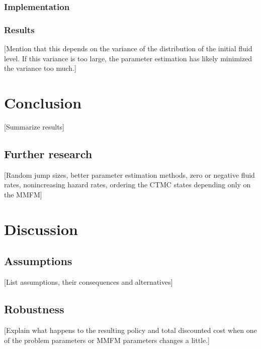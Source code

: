 \subsection{Implementation}
\subsection{Results}
[Mention that this depends on the variance of the distribution of the initial fluid level. If this variance is too large, the parameter estimation has likely minimized the variance too much.]

\chapter{Conclusion}
[Summarize results]
\section{Further research}
[Random jump sizes, better parameter estimation methods, zero or negative fluid rates, nonincreasing hazard rates, ordering the CTMC states depending only on the MMFM]

\chapter{Discussion}
\section{Assumptions}
[List assumptions, their consequences and alternatives]
\section{Robustness}
[Explain what happens to the resulting policy and total discounted cost when one of the problem parameters or MMFM parameters changes a little.]




